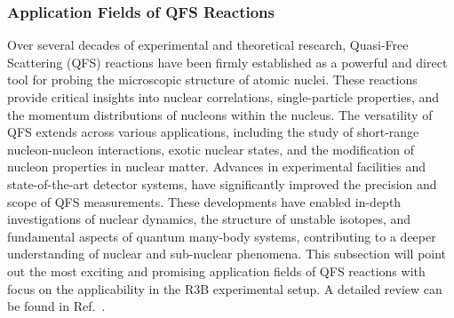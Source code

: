 \subsubsection{Application Fields of QFS Reactions}
Over several decades of experimental and theoretical research, Quasi-Free Scattering (QFS) reactions have been firmly established as a powerful and direct tool for probing the microscopic structure of atomic nuclei. These reactions provide critical insights into nuclear correlations, single-particle properties, and the momentum distributions of nucleons within the nucleus.\newline
The versatility of QFS extends across various applications, including the study of short-range nucleon-nucleon interactions, exotic nuclear states, and the modification of nucleon properties in nuclear matter. Advances in experimental facilities and state-of-the-art detector systems, have significantly improved the precision and scope of QFS measurements. These developments have enabled in-depth investigations of nuclear dynamics, the structure of unstable isotopes, and fundamental aspects of quantum many-body systems, contributing to a deeper understanding of nuclear and sub-nuclear phenomena.\newline
This subsection will point out the most exciting and promising application fields of QFS reactions with focus on the applicability in the R3B experimental setup. A detailed review can be found in Ref.~\cite{panin2021quasi}.
